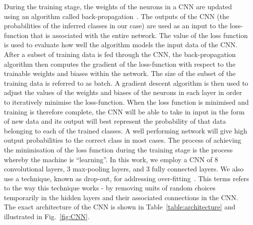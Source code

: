 \documentclass[aps,twocolumn,showpacs,groupedaddress, nofootinbib]{revtex4}  %
\begin{document}
%
%
During the training stage, the weights of the neurons in a \ac{CNN} are updated
using an algorithm called back-propagation~\cite{lecun1988theoretical}. The
outputs of the \ac{CNN} (the probabilities of the inferred classes in our case) 
are used as an input to the loss-function that is associated with the entire network.  
The value of the loss function is used to evaluate how well the algorithm models the input data of the \ac{CNN}.
After a subset of training data is fed through the \ac{CNN}, the back-propagation algorithm 
then computes the gradient of the loss-function with respect
to the trainable weights and biases within the network. 
The size of the subset of the training data is referred to as batch.
A gradient descent algorithm is then used to adjust the values of the weights and biases of the
neurons in each layer in order to iteratively minimise the loss-function.  
When the loss function is minimised and training is therefore complete, the \ac{CNN}
will be able to take in input in the form of new data and its output will best
represent the probability of that data belonging to each of the trained
classes. 
A well performing network will give high output probabilities to the
correct class in most cases. The process of achieving the minimisation of the
loss function during the training stage is the process whereby the machine is
\textquotedblleft learning\textquotedblright.
%
% 
In this work, we employ a \ac{CNN} of $8$ convolutional layers, $3$ max-pooling
layers, and $3$ fully connected layers. We also use a technique, known as drop-out, for addressing over-fitting~\cite{srivastava2014dropout}. 
This terms refers to the way this technique works - 
by removing units of random choices temporarily in the hidden layers and their associated connections in the \ac{CNN}.
The exact architecture of the \ac{CNN}
is shown in Table~\ref{table:architecture} and illustrated in
Fig.~\ref{fig:CNN}. 
%
%
\end{document}
